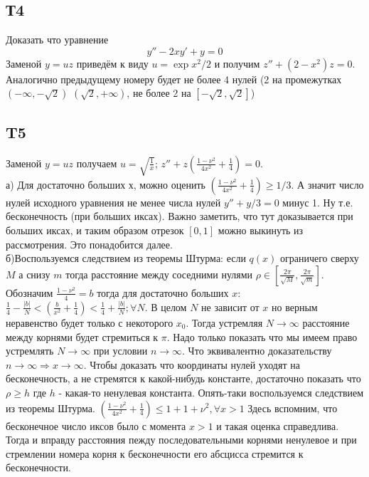 \documentclass{article}
\begin{document}
\subsection{Т4}
Доказать что уравнение 
\begin{equation}
    y''-2x y' +y=0
\end{equation}
Заменой $y=uz$ приведём к виду $u=\exp{x^2/2}$ и получим $z''+(2-x^2)z=0$. Аналогично предыдущему номеру будет не более 4 нулей (2 на промежутках $(-\infty, -\sqrt2)$ $(\sqrt2,+\infty)$, не более 2 на $[-\sqrt 2, \sqrt 2]$)
\subsection{T5}
Заменой $y=uz$ получаем $u=\sqrt{\frac{1}{x}}$; $z''+z \left( \frac{1-\nu^2}{4x^2}+\frac{1}{4} \right)=0$. \\
а) Для достаточно больших х, можно оценить $\left( \frac{1-\nu^2}{4x^2}+\frac{1}{4} \right) \geq 1/3$. А значит число нулей исходного уравнения не менее числа нулей $y''+y/3=0$ минус 1. Ну т.е. бесконечность (при больших иксах). Важно заметить, что тут доказывается при больших иксах, и таким образом отрезок $[0,1]$ можно выкинуть из рассмотрения. Это понадобится далее.\\
б)Воспользуемся следствием из теоремы Штурма: если $q(x)$ ограничего сверху $M$ а снизу $m$ тогда расстояние между соседними нулями $\rho \in [\frac{2 \pi}{\sqrt M}, \frac{2 \pi}{\sqrt m}]$.  Обозначим $\frac{1-\nu^2}{4}=b$ тогда для достаточно больших $x$: $\frac{1}{4}-\frac{|b|}{N} < \left( \frac{b}{x^2}+\frac{1}{4} \right)< \frac{1}{4}+\frac{|b|}{N}; \forall N$. В целом $N$ не зависит от $x$ но верным неравенство будет только с некоторого $x_0$. Тогда устремляя $N \rightarrow \infty$ расстояние между корнями будет стремиться к $\pi$. Надо только показать что мы имеем право устремлять $N \rightarrow \infty$ при условии $n \rightarrow \infty$. Что эквивалентно доказательству $n \rightarrow \infty \Rightarrow x \rightarrow \infty$. Чтобы доказать что координаты нулей уходят на бесконечность, а не стремятся к какой-нибудь константе, достаточно показать что $\rho \geq h$ где $h$ - какая-то ненулевая константа. Опять-таки воспользуемся следствием из теоремы Штурма. $\left( \frac{1-\nu^2}{4x^2}+\frac{1}{4} \right) \leq 1 + 1+\nu^2, \forall x>1$ Здесь вспомним, что бесконечное число иксов было с момента $x>1$ и такая оценка справедлива. Тогда и вправду расстояния пежду последовательными корнями ненулевое и при стремлении номера корня к бесконечности его абсцисса стремится к бесконечности.
\end{document}
